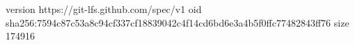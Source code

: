 version https://git-lfs.github.com/spec/v1
oid sha256:7594c87c53a8c94cf337cf18839042c4f14cd6bd6e3a4b5f0ffc77482843ff76
size 174916
